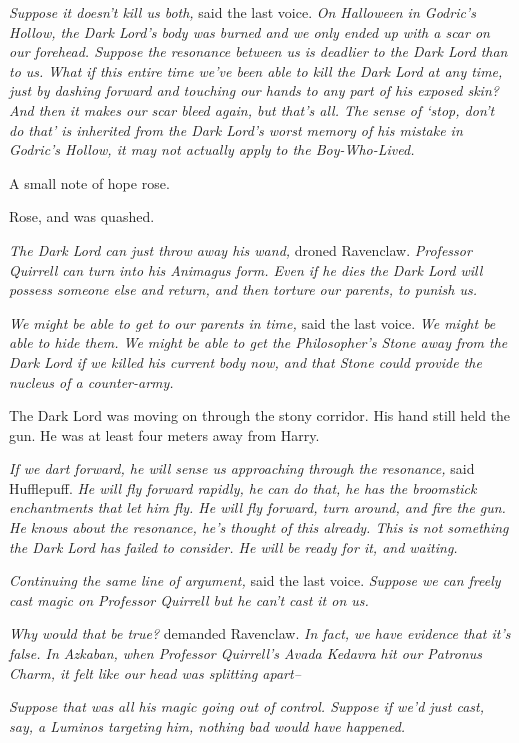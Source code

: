 \emph{Suppose it doesn't kill us both,} said the last voice. \emph{On Halloween in Godric's Hollow, the Dark Lord's body was burned and we only ended up with a scar on our forehead. Suppose the resonance between us is deadlier to the Dark Lord than to us. What if this entire time we've been able to kill the Dark Lord at any time, just by dashing forward and touching our hands to any part of his exposed skin? And then it makes our scar bleed again, but that's all. The sense of `stop, don't do that' is inherited from the Dark Lord's worst memory of his mistake in Godric's Hollow, it may not actually apply to the Boy-Who-Lived.}

A small note of hope rose.

Rose, and was quashed.

\emph{The Dark Lord can just throw away his wand,} droned Ravenclaw. \emph{Professor Quirrell can turn into his Animagus form. Even if he dies the Dark Lord will possess someone else and return, and then torture our parents, to punish us.}

\emph{We might be able to get to our parents in time,} said the last voice. \emph{We might be able to hide them. We might be able to get the Philosopher's Stone away from the Dark Lord if we killed his current body now, and that Stone could provide the nucleus of a counter-army.}

The Dark Lord was moving on through the stony corridor. His hand still held the gun. He was at least four meters away from Harry.

\emph{If we dart forward, he will sense us approaching through the resonance,} said Hufflepuff. \emph{He will fly forward rapidly, he can do that, he has the broomstick enchantments that let him fly. He will fly forward, turn around, and fire the gun. He knows about the resonance, he's thought of this already. This is not something the Dark Lord has failed to consider. He will be ready for it, and waiting.}

\emph{Continuing the same line of argument,} said the last voice. \emph{Suppose we can freely cast magic on Professor Quirrell but he can't cast it on us.}

\emph{Why would that be true?} demanded Ravenclaw. \emph{In fact, we have evidence that it's false. In Azkaban, when Professor Quirrell's Avada Kedavra hit our Patronus Charm, it felt like our head was splitting apart\---}

\emph{Suppose that was all \emph{his} magic going out of control. Suppose if we'd just cast, say, a Luminos targeting him, nothing bad would have happened.}

